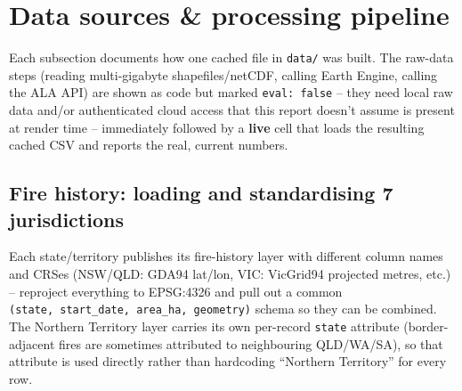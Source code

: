 \documentclass[
  letterpaper,
  DIV=11,
  numbers=noendperiod]{scrartcl}
\begin{document}
\section{Data sources \& processing
pipeline}\label{data-sources-processing-pipeline}

Each subsection documents how one cached file in \texttt{data/} was
built. The raw-data steps (reading multi-gigabyte shapefiles/netCDF,
calling Earth Engine, calling the ALA API) are shown as code but marked
\texttt{eval:\ false} -- they need local raw data and/or authenticated
cloud access that this report doesn't assume is present at render time
-- immediately followed by a \textbf{live} cell that loads the resulting
cached CSV and reports the real, current numbers.

\subsection{Fire history: loading and standardising 7
jurisdictions}\label{fire-history-loading-and-standardising-7-jurisdictions}

Each state/territory publishes its fire-history layer with different
column names and CRSes (NSW/QLD: GDA94 lat/lon, VIC: VicGrid94 projected
metres, etc.) -- reproject everything to EPSG:4326 and pull out a common
\texttt{(state,\ start\_date,\ area\_ha,\ geometry)} schema so they can
be combined. The Northern Territory layer carries its own per-record
\texttt{state} attribute (border-adjacent fires are sometimes attributed
to neighbouring QLD/WA/SA), so that attribute is used directly rather
than hardcoding ``Northern Territory'' for every row.
\end{document}
